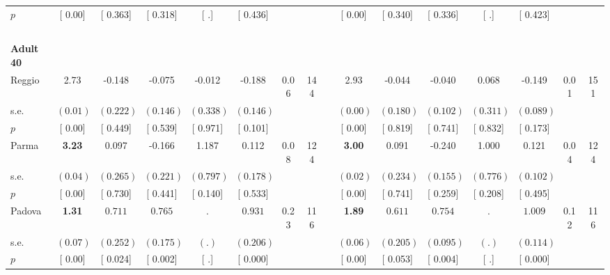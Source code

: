 \begin{longtable}{L{8em} c c c c c c c p{1em} c c c c c c c}
\quad \quad \quad \quad $ p$ & [     0.00] & [    0.363] & [    0.318] & [        .] & [    0.436] & & & & [     0.00] & [    0.340] & [    0.336] & [        .] & [    0.423] & &  \\[1em]
~\\[1em]
\quad \quad \textbf{Adult 40} & & & & & & & & & & & & & & & \\* 
\quad \quad \quad Reggio& 2.73 &    -0.148 &    -0.075 &    -0.012 &    -0.188 &      0.06 &       144 & & 2.93 &    -0.044 &    -0.040 &     0.068 &    -0.149 &      0.01 &       151  \\*
\quad \quad \quad \quad s.e.& $ (     0.01)$ & $ (    0.222)$ & $ (    0.146)$ & $ (    0.338)$ & $ (    0.146)$ & & & & $ (     0.00)$ & $ (    0.180)$ & $ (    0.102)$ & $ (    0.311)$ & $ (    0.089)$ & &  \\*
\quad \quad \quad \quad $ p$ & [     0.00] & [    0.449] & [    0.539] & [    0.971] & [    0.101] & & & & [     0.00] & [    0.819] & [    0.741] & [    0.832] & [    0.173] & &  \\[1em]
\quad \quad \quad Parma& \textbf{     3.23} &     0.097 &    -0.166 &     1.187 &     0.112 &      0.08 &       124 & & \textbf{     3.00} &     0.091 &    -0.240 &     1.000 &     0.121 &      0.04 &       124  \\*
\quad \quad \quad \quad s.e.& $ (     0.04)$ & $ (    0.265)$ & $ (    0.221)$ & $ (    0.797)$ & $ (    0.178)$ & & & & $ (     0.02)$ & $ (    0.234)$ & $ (    0.155)$ & $ (    0.776)$ & $ (    0.102)$ & &  \\*
\quad \quad \quad \quad $ p$ & [     0.00] & [    0.730] & [    0.441] & [    0.140] & [    0.533] & & & & [     0.00] & [    0.741] & [    0.259] & [    0.208] & [    0.495] & &  \\[1em]
\quad \quad \quad Padova& \textbf{     1.31} & $ \mathbf{    0.711}$ & $ \mathbf{    0.765}$ &         . & $ \mathbf{    0.931}$ &      0.23 &       116 & & \textbf{     1.89} & $ \mathbf{    0.611}$ & $ \mathbf{    0.754}$ &         . & $ \mathbf{    1.009}$ &      0.12 &       116  \\*
\quad \quad \quad \quad s.e.& $ (     0.07)$ & $ (    0.252)$ & $ (    0.175)$ & $ (        .)$ & $ (    0.206)$ & & & & $ (     0.06)$ & $ (    0.205)$ & $ (    0.095)$ & $ (        .)$ & $ (    0.114)$ & &  \\*
\quad \quad \quad \quad $ p$ & [     0.00] & [    0.024] & [    0.002] & [        .] & [    0.000] & & & & [     0.00] & [    0.053] & [    0.004] & [        .] & [    0.000] & &  \\[1em]

\end{longtable}
